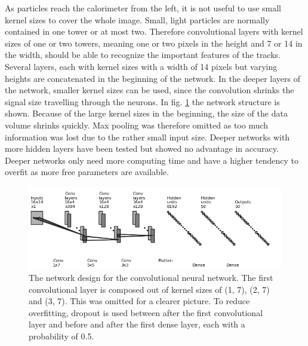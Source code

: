 As particles reach the calorimeter from the left, it is not useful to use small kernel sizes to cover the whole image. Small, light particles are normally contained in one tower or at most two. Therefore convolutional layers with kernel sizes of one or two towers, meaning one or two pixels in the height and 7 or 14 in the width, should be able to recognize the important features of the tracks. Several layers, each with kernel sizes with a width of 14 pixels but varying heights are concatenated in the beginning of the network. In the deeper layers of the network, smaller kernel sizes can be used, since the convolution shrinks the signal size travelling through the neurons. In fig. \ref{convnet} the network structure is shown. Because of the large kernel sizes in the beginning, the size of the data volume shrinks quickly. Max pooling was therefore omitted as too much information was lost due to the rather small input size. Deeper networks with more hidden layers have been tested but showed no advantage in accuracy. Deeper networks only need more computing time and have a higher tendency to overfit as more free parameters are available. 

\begin{figure}
\includegraphics[scale=0.85]{convnet_fig.png}
\caption{The network design for the convolutional neural network. The first convolutional layer is composed out of kernel sizes of (1, 7), (2, 7) and (3, 7). This was omitted for a clearer picture. To reduce overfitting, dropout is used between after the first convolutional layer and before and after the first dense layer, each with a probability of 0.5. \protect \footnotemark}
\label{convnet}
\end{figure}

